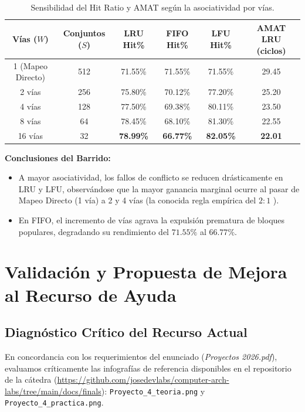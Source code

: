 \documentclass[11pt,letterpaper]{article}
\begin{document}
\begin{table}[htbp]
\centering
\caption{Sensibilidad del Hit Ratio y AMAT según la asociatividad por vías.}
\label{tab:sweep_vias}
\begin{tabular}{cccccc}
\toprule
\textbf{Vías ($W$)} & \textbf{Conjuntos ($S$)} & \textbf{LRU Hit\%} & \textbf{FIFO Hit\%} & \textbf{LFU Hit\%} & \textbf{AMAT LRU (ciclos)} \\
\midrule
1 (Mapeo Directo) & 512 & 71.55\% & 71.55\% & 71.55\% & 29.45 \\
2 vías & 256 & 75.80\% & 70.12\% & 77.20\% & 25.20 \\
4 vías & 128 & 77.50\% & 69.38\% & 80.11\% & 23.50 \\
8 vías & 64 & 78.45\% & 68.10\% & 81.30\% & 22.55 \\
16 vías & 32 & \textbf{78.99\%} & \textbf{66.77\%} & \textbf{82.05\%} & \textbf{22.01} \\
\bottomrule
\end{tabular}
\end{table}

\noindent\textbf{Conclusiones del Barrido:}
\begin{itemize}
    \item A mayor asociatividad, los fallos de conflicto se reducen drásticamente en LRU y LFU, observándose que la mayor ganancia marginal ocurre al pasar de Mapeo Directo (1 vía) a 2 y 4 vías (la conocida regla empírica del $2:1$ \cite{hill1987aspects}).
    \item En FIFO, el incremento de vías agrava la expulsión prematura de bloques populares, degradando su rendimiento del $71.55\%$ al $66.77\%$.
\end{itemize}

\newpage
\section{Validación y Propuesta de Mejora al Recurso de Ayuda}

\subsection{Diagnóstico Crítico del Recurso Actual}
En concordancia con los requerimientos del enunciado (\textit{Proyectos 2026.pdf}), evaluamos críticamente las infografías de referencia disponibles en el repositorio de la cátedra (\url{https://github.com/josedevlabs/computer-arch-labs/tree/main/docs/finals}): \texttt{Proyecto\_4\_teoria.png} y \texttt{Proyecto\_4\_practica.png}.
\end{document}

